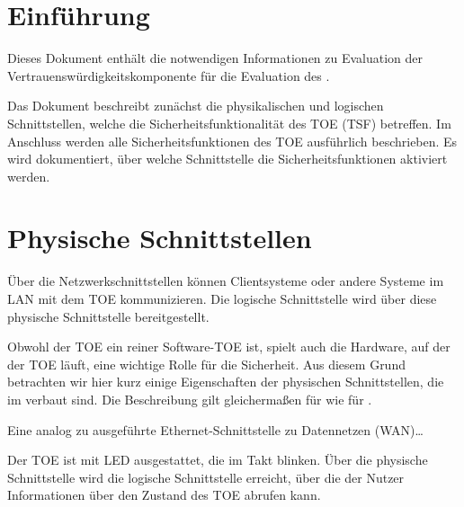 \chapter{Einführung}
\label{intro}

Dieses Dokument enthält die notwendigen Informationen zu Evaluation
der Vertrauenswürdigkeitskomponente  für die
Evaluation des \thisproduct{}.

Das Dokument beschreibt zunächst die physikalischen und logischen
Schnittstellen, welche die Sicherheitsfunktionalität des TOE (TSF) betreffen. Im
Anschluss werden alle Sicherheitsfunktionen des TOE ausführlich beschrieben. Es
wird dokumentiert, über welche Schnittstelle die Sicherheitsfunktionen aktiviert
werden.



\cleardoublepage

\chapter{Physische Schnittstellen}\label{tsfi.ps}


Über die Netzwerkschnittstellen können Clientsysteme oder andere Systeme im LAN
mit dem TOE kommunizieren. Die logische Schnittstelle \lslan{} wird über diese
physische Schnittstelle bereitgestellt.

Obwohl der TOE ein reiner Software-TOE ist, spielt auch die Hardware, auf der
der TOE läuft, eine wichtige Rolle für die Sicherheit. Aus diesem Grund
betrachten wir hier kurz einige Eigenschaften der physischen Schnittstellen, die
im \thisproduct{} verbaut sind. Die Beschreibung gilt gleichermaßen für
 wie für .



Eine analog zu  ausgeführte Ethernet-Schnittstelle zu
Datennetzen (WAN)\dots


Der TOE ist mit LED ausgestattet, die im Takt blinken. Über die physische
Schnittstelle wird die logische Schnittstelle \lsled{} erreicht, über die der
Nutzer Informationen über den Zustand des TOE abrufen kann.

